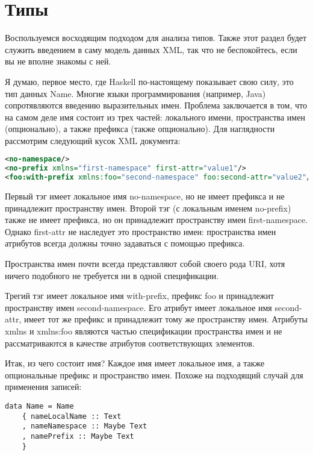\section{Типы} %

Воспользуемся восходящим подходом для анализа типов. Также этот раздел будет служить введением в саму модель данных XML, так что не беспокойтесь, если вы не вполне знакомы с ней.

Я думаю, первое место, где Haskell по-настоящему показывает свою силу, это тип данных Name. Многие языки программирования (например, Java) сопротявляются введению выразительных имен. Проблема заключается в том, что на самом деле имя состоит из трех частей: локального имени, пространства имен (опционально), а также префикса (также опционально). Для наглядности рассмотрим следующий кусок XML документа:

\begin{lstlisting}[language=XML]
<no-namespace/>
<no-prefix xmlns="first-namespace" first-attr="value1"/>
<foo:with-prefix xmlns:foo="second-namespace" foo:second-attr="value2"/>
\end{lstlisting}

Первый тэг имеет локальное имя no-namespace, но не имеет префикса и не принадлежит пространству имен. Второй тэг (с локальным именем no-prefix) также не имеет префикса, но он принадлежит пространству имен first-namespace. Однако first-attr не наследует это пространство имен: пространства имен атрибутов всегда должны точно задаваться с помощью префикса.

\begin{remark}
Пространства имен почти всегда представляют собой своего рода URI, хотя ничего подобного не требуется ни в одной спецификации.
\end{remark}

Трегий тэг имеет локальное имя with-prefix, префикс foo и принадлежит пространству имен second-namespace. Его атрибут имеет локальное имя second-attr, имеет тот же префикс и принадлежит тому же пространству имен. Атрибуты xmlns и xmlns:foo являются частью спецификации пространства имен и не рассматриваются в качестве атрибутов соответствующих элементов.

Итак, из чего состоит имя? Каждое имя имеет локальное имя, а также опциональные префикс и пространство имен. Похоже на подходящий случай для применения записей:

\begin{lstlisting}
data Name = Name
    { nameLocalName :: Text
    , nameNamespace :: Maybe Text
    , namePrefix :: Maybe Text
    }
\end{lstlisting}


